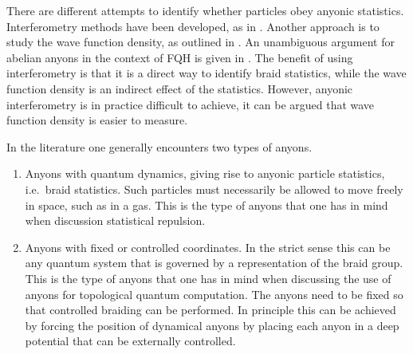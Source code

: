 There are different attempts to identify whether particles obey anyonic statistics. Interferometry methods have been developed, as in \cite{bonderson}. Another approach is to study the wave function density, as outlined in \cite{lundholm-rougerie,fractional angular momentum}. An unambiguous argument for abelian anyons in the context of FQH is given in \cite{lundholm-rougerie}. The benefit of using interferometry is that it is a direct way to identify braid statistics, while the wave function density is an indirect effect of the statistics. However, anyonic interferometry is in practice difficult to achieve, it can be argued that wave function density is easier to measure.

In the literature one generally encounters two types of anyons.
\begin{enumerate}
  \item Anyons with quantum dynamics, giving rise to anyonic particle statistics, i.e.\ braid statistics. Such particles must necessarily be allowed to move freely in space, such as in a gas. This is the type of anyons that one has in mind when discussion statistical repulsion.
  \item Anyons with fixed or controlled coordinates. In the strict sense this can be any quantum system that is governed by a representation of the braid group. This is the type of anyons that one has in mind when discussing the use of anyons for topological quantum computation. The anyons need to be fixed so that controlled braiding can be performed. In principle this can be achieved by forcing the position of dynamical anyons by placing each anyon in a deep potential that can be externally controlled.
\end{enumerate}
